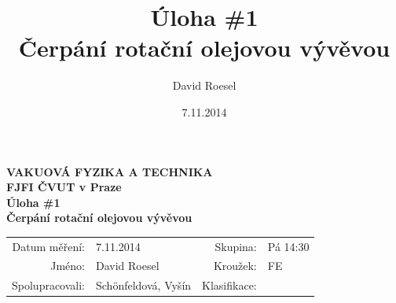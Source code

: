 \documentclass[english]{article}
\newcommand{\Author}{David Roesel}
\newcommand{\Coauthor}{Schönfeldová, Vyšín}
\newcommand{\Institute}{FJFI ČVUT v Praze}
\newcommand{\Subject}{VAKUOVÁ FYZIKA A TECHNIKA}
\newcommand{\Group}{Pá 14:30}
\newcommand{\Kruh}{FE}
\newcommand{\Title}{Úloha \#1  \\Čerpání rotační olejovou vývěvou}
\newcommand{\Date}{7.11.2014}
\begin{document}
\author{\Author}
\title{\Title}
\date{\Date}

\renewcommand{\figurename}{Obr.}
\renewcommand{\tablename}{Tab.}
\renewcommand{\refname}{Reference}


\setlength{\parindent}{0cm}
\begin{multicols}{2}
\textbf{\Subject \\
        \Institute \\[0.1cm]
\Title \\[0.5cm]
}
\begin{tabular}{rlrl}
\large Datum měření: & \Date & \large Skupina: & \Group \\
\large Jméno: & \Author & \large Kroužek:  & \Kruh\\
\large Spolupracovali: & \Coauthor &\large Klasifikace:\\
\end{tabular}


\end{multicols}
\end{document}

